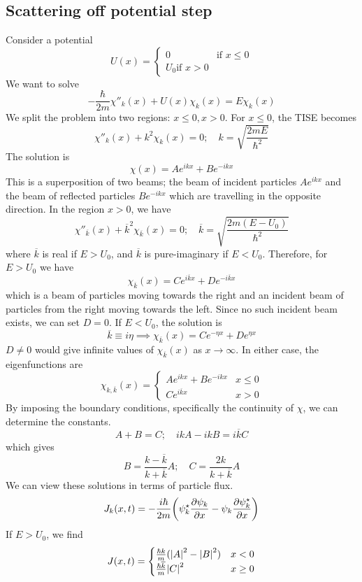 \subsection{Scattering off potential step}
Consider a potential
\[
	U(x) =
	\begin{cases}
		0 & \text{if } x \leq 0 \\
		U_0 \text{if } x > 0
	\end{cases}
\]
We want to solve
\[
	-\frac{\hbar}{2m} \chi''_k(x) + U(x) \chi_k(x) = E\chi_k(x)
\]
We split the problem into two regions: \( x \leq 0, x > 0 \).
For \( x \leq 0 \), the TISE becomes
\[
	\chi''_k(x) + k^2 \chi_k(x) = 0;\quad k = \sqrt{\frac{2mE}{\hbar^2}}
\]
The solution is
\[
	\chi(x) = Ae^{ikx} + Be^{-ikx}
\]
This is a superposition of two beams; the beam of incident particles \( Ae^{ikx} \) and the beam of reflected particles \( Be^{-ikx} \) which are travelling in the opposite direction.
In the region \( x > 0 \), we have
\[
	\chi''_{\overline k}(x) + \overline k^2 \chi_{\overline k}(x) = 0;\quad \overline k = \sqrt{\frac{2m(E-U_0)}{\hbar^2}}
\]
where \( \overline k \) is real if \( E > U_0 \), and \( \overline k \) is pure-imaginary if \( E < U_0 \).
Therefore, for \( E > U_0 \) we have
\[
	\chi_{\overline k}(x) = Ce^{i \overline k x} + De^{-i \overline k x}
\]
which is a beam of particles moving towards the right and an incident beam of particles from the right moving towards the left.
Since no such incident beam exists, we can set \( D = 0 \).
If \( E < U_0 \), the solution is
\[
	\overline k \equiv i \eta \implies \chi_{\overline k}(x) = Ce^{-\eta x} + De^{\eta x}
\]
\( D \neq 0 \) would give infinite values of \( \chi_{\overline k}(x) \) as \( x \to \infty \).
In either case, the eigenfunctions are
\[
	\chi_{k, \overline k}(x) =
	\begin{cases}
		Ae^{ikx} + Be^{-ikx} & x \leq 0 \\
		Ce^{i \overline k x} & x > 0
	\end{cases}
\]
By imposing the boundary conditions, specifically the continuity of \( \chi \), we can determine the constants.
\[
	A + B = C;\quad ikA - ikB = i\overline k C
\]
which gives
\[
	B = \frac{k - \overline k}{k + \overline k} A;\quad C = \frac{2k}{k + \overline k}A
\]
We can view these solutions in terms of particle flux.
\[
	J_k(x,t) = - \frac{i\hbar}{2m} \qty(\psi^\star_k \pdv{\psi_k}{x} - \psi_k \pdv{\psi_k^\star}{x})
\]
If \( E > U_0 \), we find
\[
	J(x,t) =
	\begin{cases}
		\frac{\hbar k}{m} (\abs{A}^2 - \abs{B}^2) & x < 0    \\
		\frac{\hbar \overline k}{m} \abs{C}^2     & x \geq 0
	\end{cases}
\]
